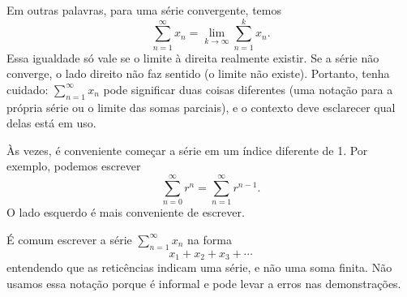 Em outras palavras, para uma série convergente, temos
\begin{equation*}
\sum_{n=1}^\infty x_n
=
\lim_{k\to\infty} 
\sum_{n=1}^k x_n .
\end{equation*}
Essa igualdade só vale se o limite à direita realmente existir. Se a série não
converge, o lado direito não faz sentido (o limite não existe).
Portanto, tenha cuidado: $\sum_{n=1}^\infty x_n$ pode significar duas coisas
diferentes (uma notação para a própria série ou o limite das somas parciais),
e o contexto deve esclarecer qual delas está em uso.

\begin{remark}
Às vezes, é conveniente começar
a série em um índice diferente de 1. Por exemplo, podemos escrever
\begin{equation*}
\sum_{n=0}^\infty r^n = \sum_{n=1}^\infty r^{n-1} .
\end{equation*}
O lado esquerdo é mais conveniente de escrever.
\end{remark}

\begin{remark}
É comum escrever a série $\sum_{n=1}^\infty x_n$ na forma
\begin{equation*}
x_1 + x_2 + x_3 + \cdots
\end{equation*}
entendendo que as reticências indicam uma série,
e não uma soma finita. Não usamos essa notação porque é informal e pode
levar a erros nas demonstrações.
\end{remark}

